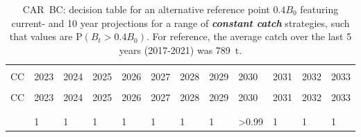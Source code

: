 \documentclass[11pt]{book}
\newcommand{\itbf}[1]{\textit{\textbf{#1}}}
\begin{document}
\begin{longtable}[c]{>{\raggedright\let\newline\\\arraybackslash\hspace{0pt}}p{0.51in}>{\raggedleft\let\newline\\\arraybackslash\hspace{0pt}}p{0.51in}>{\raggedleft\let\newline\\\arraybackslash\hspace{0pt}}p{0.52in}>{\raggedleft\let\newline\\\arraybackslash\hspace{0pt}}p{0.52in}>{\raggedleft\let\newline\\\arraybackslash\hspace{0pt}}p{0.52in}>{\raggedleft\let\newline\\\arraybackslash\hspace{0pt}}p{0.52in}>{\raggedleft\let\newline\\\arraybackslash\hspace{0pt}}p{0.52in}>{\raggedleft\let\newline\\\arraybackslash\hspace{0pt}}p{0.52in}>{\raggedleft\let\newline\\\arraybackslash\hspace{0pt}}p{0.52in}>{\raggedleft\let\newline\\\arraybackslash\hspace{0pt}}p{0.52in}>{\raggedleft\let\newline\\\arraybackslash\hspace{0pt}}p{0.52in}>{\raggedleft\let\newline\\\arraybackslash\hspace{0pt}}p{0.52in}}
  \caption{CAR~BC: decision table for an alternative reference point $0.4 B_0$ featuring current- and 10 year projections for a range of \itbf{constant catch} strategies, such that values are P$(B_t > 0.4 B_0)$.  For reference, the average catch over the last 5 years (2017-2021) was 789~t. } \label{tab:car.gmu.40B0.CCs}\\  \hline\\[-2.2ex]  CC  & 2023 & 2024 & 2025 & 2026 & 2027 & 2028 & 2029 & 2030 & 2031 & 2032 & 2033 \\[0.2ex]\hline\\[-1.5ex]  \endfirsthead   \hline  CC  & 2023 & 2024 & 2025 & 2026 & 2027 & 2028 & 2029 & 2030 & 2031 & 2032 & 2033 \\[0.2ex]\hline\\[-1.5ex]  \endhead  \hline\\[-2.2ex]   \endfoot  \hline \endlastfoot  0 & 1 & 1 & 1 & 1 & 1 & 1 & 1 & >0.99 & 1 & 1 & 1 \\ 

\end{longtable}
\end{document}
